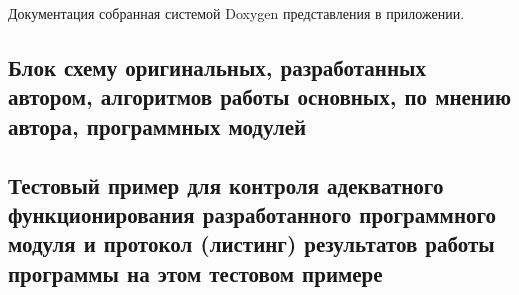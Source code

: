 Документация собранная системой Doxygen представления в приложении.
\subsection{Блок схему оригинальных, разработанных автором, алгоритмов работы основных, по мнению автора, программных модулей}
\subsection{Тестовый пример для контроля адекватного функционирования разработанного программного модуля и протокол (листинг) результатов работы программы на этом тестовом примере}